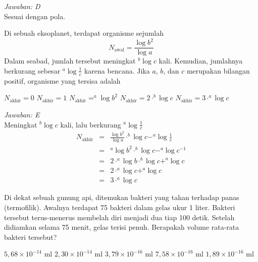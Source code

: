 \documentclass[11pt,fleqn, a4paper]{exam}
\begin{document}
\begin{questions}
\textit{Jawaban: D}\\
Sesuai dengan pola.


\vspace{0.5cm}
\question Di sebuah eksoplanet, terdapat organisme sejumlah
\begin{equation*}
N_{\text{awal}} = \frac{\log{b^2}}{\log{a}}
\end{equation*}
Dalam seabad, jumlah tersebut meningkat $^{b}\log{c}$ kali. Kemudian, jumlahnya berkurang sebesar $^{a}\log{\frac{1}{c}}$ karena bencana. Jika $a$, $b$, dan $c$ merupakan bilangan positif, organisme yang tersisa adalah
\begin{choices}
\choice $N_{\text{akhir}} = 0$
\choice $N_{\text{akhir}} = 1$
\choice $N_{\text{akhir}} = ^{a}\log{b^2}$
\choice $N_{\text{akhir}} = 2 \cdot ^{b}\log{c}$
\choice $N_{\text{akhir}} = 3 \cdot ^{a}\log{c}$
\end{choices}

\textit{Jawaban: E}\\
Meningkat $^{b}\log{c}$ kali, lalu berkurang $^{a}\log{\frac{1}{c}}$
\begin{eqnarray*}
N_{\text{akhir}} &=& \frac{\log{b^2}}{\log{a}} \cdot ^{b}\log{c} - ^{a}\log{\frac{1}{c}}\\
&=& ^{a}\log{b^2} \cdot ^{b}\log{c} - ^{a}\log{c^{-1}}\\
&=& 2 \cdot ^{a}\log{b} \cdot ^{b}\log{c} + ^{a}\log{c}\\
&=& 2 \cdot ^{a}\log{c} + ^{a}\log{c}\\
&=& 3 \cdot ^{a}\log{c}
\end{eqnarray*}

\vspace{0.5cm}
\question  Di dekat sebuah gunung api, ditemukan bakteri yang tahan terhadap panas (termofilik). Awalnya terdapat 75 bakteri dalam gelas ukur 1 liter. Bakteri tersebut terus-menerus membelah diri menjadi dua tiap 100 detik. Setelah didiamkan selama 75 menit, gelas terisi penuh. Berapakah volume rata-rata bakteri tersebut?
\begin{choices}
\choice $5,68 \times 10^{-14} $ ml
\choice $2,30 \times 10^{-14} $ ml
\choice $3,79 \times 10^{-16} $ ml
\choice $7,58 \times 10^{-16} $ ml
\choice $1,89 \times 10^{-16} $ ml
\end{choices}


\end{questions}
\end{document}
